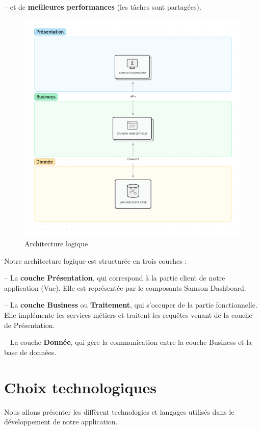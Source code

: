 \documentclass[a4paper, 12pt]{report}
\begin{document}
-- et de \textbf{meilleures performances} (les tâches sont partagées).
\begin{figure}[H]
    \centering
    \includegraphics[width = 1\linewidth]{img/3-tiers.png}
    \caption{Architecture logique}
\end{figure}
Notre architecture logique est structurée en trois couches :

-- La \textbf{couche Présentation}, qui correspond à la partie client de notre application (Vue). Elle est représentée par le composants Samson Dashboard.


-- La \textbf{couche Business} ou \textbf{Traitement}, qui s’occuper de la partie fonctionnelle. Elle implémente les services métiers et traitent les requêtes venant de la couche de Présentation.

-- La couche \textbf{Donnée}, qui gère la communication entre la couche Business et la
base de données.

\section{Choix technologiques}
Nous allons présenter les diffèrent technologies et langages utilisés dans le développement de
notre application.
\end{document}
